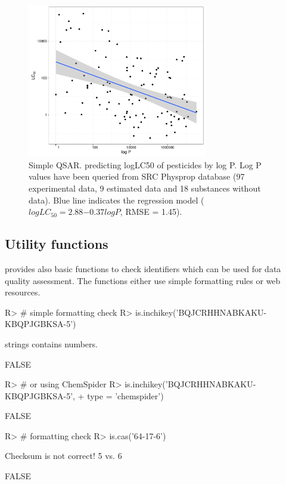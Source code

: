 \documentclass[article, shortnames]{jss}\usepackage[]{graphicx}\usepackage[]{color}
\begin{document}
\begin{figure}[ht]
\begin{CodeChunk}


{\centering \includegraphics[width=0.7\textwidth]{plot_qsar-1} 

}

\end{CodeChunk}
\caption{Simple QSAR. predicting logLC50 of pesticides by log P. 
Log P values have been queried from SRC Physprop database (97 experimental data, 9 estimated data and 18 substances without data). 
Blue line indicates the regression model ($log LC_{50} = 2.88\ensuremath{-0.37} logP$, RMSE = 1.45).}
\label{fig:fig3}
\end{figure}


\subsection[Utility functions]{Utility functions}
 provides also basic functions to check identifiers which can be used for data quality assessment.
The functions either use simple formatting rules or web resources.

\begin{CodeChunk}
\begin{CodeInput}
R> # simple formatting check
R> is.inchikey('BQJCRHHNABKAKU-KBQPJGBKSA-5')
\end{CodeInput}
\begin{CodeOutput}
strings contains numbers.
\end{CodeOutput}
\begin{CodeOutput}
[1] FALSE
\end{CodeOutput}
\begin{CodeInput}
R> # or using ChemSpider
R> is.inchikey('BQJCRHHNABKAKU-KBQPJGBKSA-5', 
+        type = 'chemspider')
\end{CodeInput}
\begin{CodeOutput}
[1] FALSE
\end{CodeOutput}
\begin{CodeInput}
R> # formatting check
R> is.cas('64-17-6')
\end{CodeInput}
\begin{CodeOutput}
Checksum is not correct! 5 vs. 6
\end{CodeOutput}
\begin{CodeOutput}
[1] FALSE
\end{CodeOutput}
\end{CodeChunk}
\end{document}
